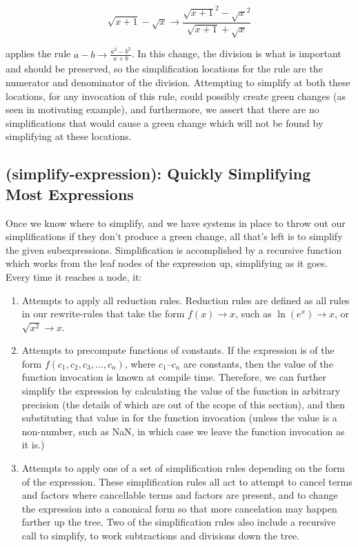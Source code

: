 \documentclass{article}
\newcommand{\lnexp}[1]{\ln{\left(e^{#1}\right)}}
\newcommand{\sqrsqrt}[1]{\sqrt{#1}^2}
\begin{document}
\[\sqrt{x + 1} - \sqrt{x} \to \frac{\sqrsqrt{x + 1} - \sqrsqrt{x}}{\sqrt{x + 1} + \sqrt{x}}\]

applies the rule 
$a - b \to  \frac{a^2 - b^2}{a + b}$. 
In this change, 
the division is what is important 
and should be preserved, 
so the simplification locations 
for the rule are the numerator 
and denominator of the division. 
Attempting to simplify at both these locations, 
for any invocation of this rule, 
could possibly create green changes 
(as seen in motivating example), 
and furthermore, 
we assert that there are no simplifications 
that would cause a green change 
which will not be found 
by simplifying at these locations.

\subsection{(simplify-expression): Quickly Simplifying Most Expressions}

Once we know where to simplify, 
and we have systems in place 
to throw out our simplifications 
if they don't produce a green change, 
all that's left is to simplify the given subexpressions. 
Simplification is accomplished 
by a recursive function 
which works from the leaf nodes 
of the expression up, 
simplifying as it goes. 
Every time it reaches a node, it:

\begin{enumerate}
\item Attempts to apply all reduction rules. 
Reduction rules are defined as all rules 
in our rewrite-rules 
that take the form $f(x) \to x$, 
such as $\lnexp{x} \to x$, 
or $\sqrt{x^2} \to x$.

\item Attempts to precompute functions of constants. 
If the expression 
is of the form $f(c_1, c_2, c_3,..., c_n)$, 
where $c_1$--$c_n$ are constants, 
then the value of the function invocation 
is known at compile time. 
Therefore, we can further simplify the expression 
by calculating the value of the function 
in arbitrary precision 
(the details of which are out of the scope of this section), 
and then substituting that value 
in for the function invocation 
(unless the value is a non-number, 
such as NaN, 
in which case we leave the function invocation 
as it is.)

\item Attempts to apply one 
of a set of simplification rules 
depending on the form of the expression. 
These simplification rules 
all act to attempt to cancel terms and factors 
where cancellable terms and factors are present, 
and to change the expression into a canonical form 
so that more cancelation may happen 
farther up the tree. 
Two of the simplification rules 
also include a recursive call to simplify, 
to work subtractions and divisions down the tree.
\end{enumerate}
\end{document}
